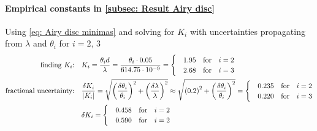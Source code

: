 \documentclass{emulateapj}
\begin{document}
\begin{appendices}
\paragraph{Empirical constants in \cref{subsec: Result Airy disc}} Using \cref{eq: Airy disc minimas} and solving for $K_i$ with uncertainties propagating from $\lambda$ and $\theta_i$ for $i = 2, \, 3$
\begin{align*}
\qq*{finding $K_i$:} & K_i = \frac{\theta_i d}{\lambda} = \frac{\theta_i \cdot 0.05}{614.75 \cdot 10^{-9}} = 
\begin{cases}
& 1.95 \qfor i=2
\\
& 2.68 \qfor i=3
\end{cases}
\\
\qq*{fractional uncertainty:} & \frac{\delta K_i}{\abs{K_i}} =  \sqrt{ \qty(\frac{\delta \theta_i}{\theta_i})^2 + \qty(\frac{\delta \lambda}{\lambda})^2 } \approx \sqrt{\qty(0.2)^2 + \qty(\frac{\delta \theta_i}{\theta_i})^2} =
\begin{cases}
& 0.235 \qfor i = 2
\\
& 0.220 \qfor i = 3
\end{cases}
\\
& \delta K_i =
\begin{cases}
& 0.458 \qfor i=2
\\
& 0.590 \qfor i=2
\end{cases}
\end{align*}
\end{appendices}
\end{document}

